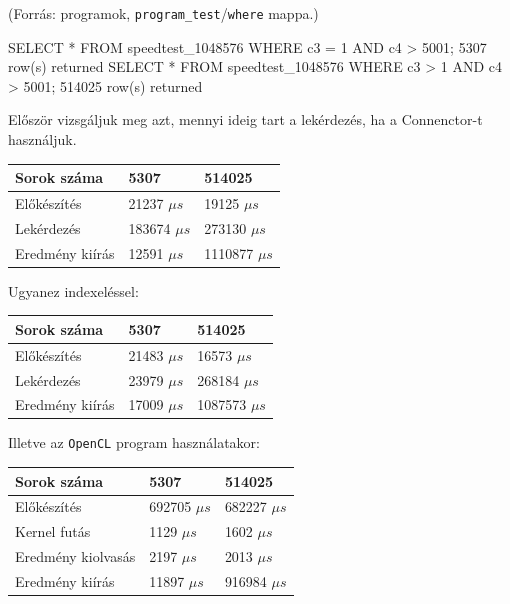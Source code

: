 
(Forrás: programok, \texttt{program\_test}/\texttt{where} mappa.)

\begin{python}
SELECT * FROM speedtest_1048576 WHERE c3 = 1 AND c4 > 5001;
	5307 row(s) returned
SELECT * FROM speedtest_1048576 WHERE c3 > 1 AND c4 > 5001;
	514025 row(s) returned
\end{python}
Először vizsgáljuk meg azt, mennyi ideig tart a lekérdezés, ha a Connenctor-t használjuk.

\begin{table}[h!]
\centering
\begin{tabular}{|p{6cm}|p{3cm}|p{3cm}|}
\hline
Sorok száma & 5307 & 514025 \\
\hline\hline

Előkészítés & 21237 $\mu s$ & 19125 $\mu s$ \\
\hline

Lekérdezés & 183674 $\mu s$ & 273130 $\mu s$ \\
\hline

Eredmény kiírás & 12591 $\mu s$ & 1110877 $\mu s$ \\
\hline
\end{tabular}
\end{table}

\noindent Ugyanez indexeléssel:

\begin{table}[h!]
\centering
\begin{tabular}{|p{6cm}|p{3cm}|p{3cm}|}
\hline
Sorok száma & 5307 & 514025 \\
\hline
\hline

Előkészítés & 21483 $\mu s$ & 16573 $\mu s$ \\
\hline

Lekérdezés & 23979 $\mu s$ & 268184 $\mu s$ \\
\hline

Eredmény kiírás & 17009 $\mu s$ & 1087573 $\mu s$ \\
\hline
\end{tabular}
\end{table}

\newpage

\noindent Illetve az \texttt{OpenCL} program használatakor:

\begin{table}[h!]
\centering
\begin{tabular}{|p{6cm}|p{3cm}|p{3cm}|}
\hline
Sorok száma & 5307 & 514025 \\
\hline
\hline
Előkészítés & 692705 $\mu s$ & 682227 $\mu s$ \\
\hline
Kernel futás & 1129 $\mu s$ & 1602 $\mu s$ \\
\hline
Eredmény kiolvasás & 2197 $\mu s$ & 2013 $\mu s$ \\
\hline
Eredmény kiírás & 11897 $\mu s$ & 916984 $\mu s$ \\
\hline
\end{tabular}
\end{table}

